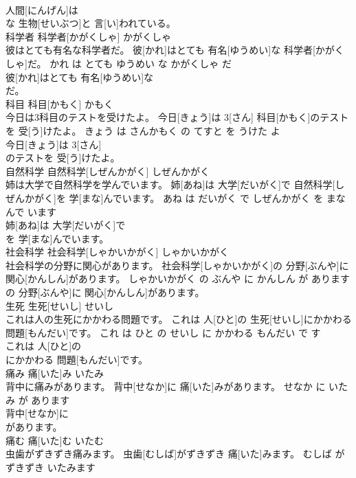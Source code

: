 \documentclass[8pt]{extreport}
\begin{document}
\begin{CJK}{UTF8}{min}
\\	人間[にんげん]は
\\	な 生物[せいぶつ]と 言[い]われている。			
\\	科学者	科学者[かがくしゃ]	かがくしゃ	
\\	彼はとても有名な科学者だ。	彼[かれ]はとても 有名[ゆうめい]な 科学者[かがくしゃ]だ。	かれ は とても ゆうめい な かがくしゃ だ	
\\	彼[かれ]はとても 有名[ゆうめい]な
\\	だ。			
\\	科目	科目[かもく]	かもく	
\\	今日は3科目のテストを受けたよ。	今日[きょう]は 3[さん] 科目[かもく]のテストを 受[う]けたよ。	きょう は さんかもく の てすと を うけた よ	
\\	今日[きょう]は 3[さん]
\\	のテストを 受[う]けたよ。			
\\	自然科学	自然科学[しぜんかがく]	しぜんかがく	
\\	姉は大学で自然科学を学んでいます。	姉[あね]は 大学[だいがく]で 自然科学[しぜんかがく]を 学[まな]んでいます。	あね は だいがく で しぜんかがく を まなんで います	
\\	姉[あね]は 大学[だいがく]で
\\	を 学[まな]んでいます。			
\\	社会科学	社会科学[しゃかいかがく]	しゃかいかがく	
\\	社会科学の分野に関心があります。	社会科学[しゃかいかがく]の 分野[ぶんや]に 関心[かんしん]があります。	しゃかいかがく の ぶんや に かんしん が あります	
\\	の 分野[ぶんや]に 関心[かんしん]があります。			
\\	生死	生死[せいし]	せいし	
\\	これは人の生死にかかわる問題です。	これは 人[ひと]の 生死[せいし]にかかわる 問題[もんだい]です。	これ は ひと の せいし に かかわる もんだい で す	
\\	これは 人[ひと]の
\\	にかかわる 問題[もんだい]です。			
\\	痛み	痛[いた]み	いたみ	
\\	背中に痛みがあります。	背中[せなか]に 痛[いた]みがあります。	せなか に いたみ が あります	
\\	背中[せなか]に
\\	があります。			
\\	痛む	痛[いた]む	いたむ	
\\	虫歯がずきずき痛みます。	虫歯[むしば]がずきずき 痛[いた]みます。	むしば が ずきずき いたみます	

\end{CJK}
\end{document}
